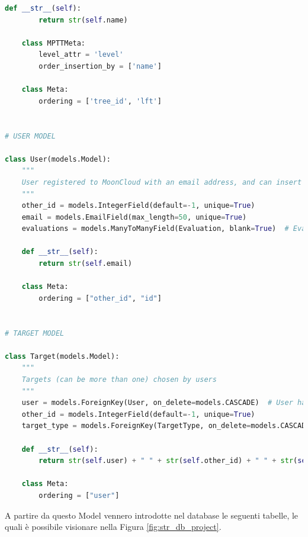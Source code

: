 \begin{lstlisting}[language=Python, label=lst:model, caption={Parti principali del codice dei Models della soluzione.}]
    def __str__(self):
        return str(self.name)

    class MPTTMeta:
        level_attr = 'level'
        order_insertion_by = ['name']

    class Meta:
        ordering = ['tree_id', 'lft']


# USER MODEL

class User(models.Model):
    """
    User registered to MoonCloud with an email address, and can insert Target and launch Evaluations
    """
    other_id = models.IntegerField(default=-1, unique=True)
    email = models.EmailField(max_length=50, unique=True)
    evaluations = models.ManyToManyField(Evaluation, blank=True)  # Evaluations chosen by user

    def __str__(self):
        return str(self.email)

    class Meta:
        ordering = ["other_id", "id"]


# TARGET MODEL

class Target(models.Model):
    """
    Targets (can be more than one) chosen by users
    """
    user = models.ForeignKey(User, on_delete=models.CASCADE)  # User has chosen some target_type
    other_id = models.IntegerField(default=-1, unique=True)
    target_type = models.ForeignKey(TargetType, on_delete=models.CASCADE)  # TargetType Id

    def __str__(self):
        return str(self.user) + " " + str(self.other_id) + " " + str(self.target_type)

    class Meta:
        ordering = ["user"]
\end{lstlisting}
%
A partire da questo Model vennero introdotte nel database le seguenti tabelle, le quali è possibile visionare nella Figura 
\ref{fig:str_db_project}.
